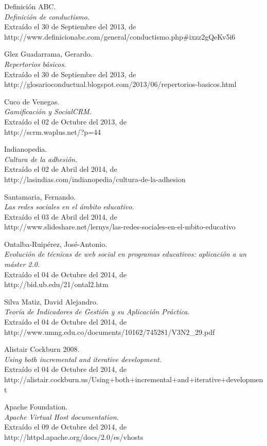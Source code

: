 \begin{thebibliography}{99}
 Definición ABC.\\
\emph{Definición de conductismo.}\\
Extraído el 30 de Septiembre del 2013, de\\
http://www.definicionabc.com/general/conductismo.php\#ixzz2gQeKv5i6

 Glez Guadarrama, Gerardo.\\
\emph{Repertorios básicos.}\\
Extraído el 30 de Septiembre del 2013, de\\
http://glosarioconductual.blogspot.com/2013/06/repertorios-basicos.html

 Cuco de Venegas.\\
\emph{Gamificación y SocialCRM.}\\
Extraído el 02 de Octubre del 2013, de\\
http://scrm.waplus.net/?p=44

 Indianopedia.\\
\emph{Cultura de la adhesión.}\\
Extraído el 02 de Abril del 2014, de\\
http://lasindias.com/indianopedia/cultura-de-la-adhesion

 Santamaria, Fernando.\\
\emph{Las redes sociales en el ámbito educativo.}\\
Extraído el 03 de Abril del 2014, de\\
http://www.slideshare.net/lernys/las-redes-sociales-en-el-mbito-educativo

 Ontalba-Ruipérez, José-Antonio.\\
\emph{Evolución de técnicas de web social en programas educativos: aplicación a
un máster 2.0.}\\
Extraído el 04 de Octubre del 2014, de\\
http://bid.ub.edu/21/ontal2.htm

 Silva Matiz, David Alejandro.\\
\emph{Teoría de Indicadores de Gestión y su Aplicación Práctica.}\\
Extraído el 04 de Octubre del 2014, de\\
http://www.umng.edu.co/documents/10162/745281/V3N2\_29.pdf

 Alistair Cockburn 2008.\\
\emph{Using both incremental and iterative development.}\\
Extraído el 04 de Octubre del 2014, de\\
http://alistair.cockburn.us/Using+both+incremental+and+iterative+development

 Apache Foundation.\\
\emph{Apache Virtual Host documentation.}\\
Extraído el 09 de Octubre del 2014, de\\
http://httpd.apache.org/docs/2.0/es/vhosts

\end{thebibliography}
